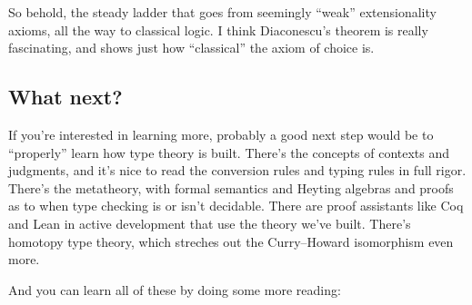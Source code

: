 \documentclass[11pt,paper=letter]{scrartcl}
\begin{document}
So behold, the steady ladder that goes from seemingly ``weak'' extensionality axioms, all the way to classical logic. I think Diaconescu's theorem is really fascinating, and shows just how ``classical'' the axiom of choice is.

\subsection{What next?}

If you're interested in learning more, probably a good next step would be to ``properly'' learn how type theory is built. There's the concepts of contexts and judgments, and it's nice to read the conversion rules and typing rules in full rigor. There's the metatheory, with formal semantics and Heyting algebras and proofs as to when type checking is or isn't decidable. There are proof assistants like Coq and Lean in active development that use the theory we've built. There's homotopy type theory, which streches out the Curry--Howard isomorphism even more.

And you can learn all of these by doing some more reading:
\end{document}
